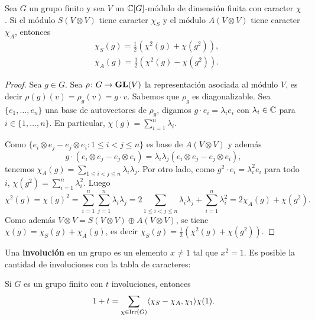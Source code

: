 \begin{proposition}
    Sea $G$ un grupo finito y  
    sea $V$ un $\mathbb{C}[G]$-módulo de dimensión finita con caracter $\chi$. Si el módulo $S(V\otimes V)$ 
    tiene caracter $\chi_S$ y el módulo $A(V\otimes V)$ tiene caracter $\chi_A$, entonces 
    \begin{align*}
        &\chi_S(g)=\frac12(\chi^2(g)+\chi(g^2)),\\
        &\chi_A(g)=\frac12(\chi^2(g)-\chi(g^2)).
    \end{align*}
\end{proposition}

\begin{proof}
    Sea $g\in G$. Sea $\rho\colon G\to\mathbf{GL}(V)$ la representación asociada al módulo $V$, es decir $\rho(g)(v)=\rho_g(v)=g\cdot v$. 
    Sabemos que $\rho_g$ es diagonalizable. Sea $\{e_1,\dots,e_n\}$ una base de autovectores de $\rho_g$, digamos
    $g\cdot e_i=\lambda_ie_i$ con $\lambda_i\in\mathbb{C}$ para $i\in\{1,\dots,n\}$. En particular, $\chi(g)=\sum_{i=1}^n\lambda_i$. 
    
    Como $\{e_i\otimes e_j-e_j\otimes e_i:1\leq i<j\leq n\}$ es base de $A(V\otimes V)$ y además 
    \[
    g\cdot (e_i\otimes e_j-e_j\otimes e_i)=\lambda_i\lambda_j(e_i\otimes e_j-e_j\otimes e_i),
    \]
    tenemos $\chi_A(g)=\sum_{1\leq i<j\leq n}\lambda_i\lambda_j$. Por otro lado, como $g^2\cdot e_i=\lambda_i^2e_i$ para todo $i$,
    $\chi(g^2)=\sum_{i=1}^n\lambda_i^2$. Luego
    \[
    \chi^2(g)=\chi(g)^2=\sum_{i=1}^n\sum_{j=1}^n\lambda_i\lambda_j=2\sum_{1\leq i<j\leq n}\lambda_i\lambda_j+\sum_{i=1}^n\lambda_i^2=2\chi_A(g)+\chi(g^2).
    \]
    Como además $V\otimes V=S(V\otimes V)\oplus A(V\otimes V)$, se tiene 
    $\chi(g)=\chi_S(g)+\chi_A(g)$, es decir 
    $\chi_S(g)=\frac12(\chi^2(g)+\chi(g^2))$.
\end{proof}

Una \textbf{involución} en un grupo es un elemento $x\ne 1$ tal que $x^2=1$. 
Es posible la cantidad de involuciones 
con la tabla de caracteres:

\begin{proposition}
Si $G$ es un grupo finito con $t$ involuciones, entonces 
\[
1+t=\sum_{\chi\in\operatorname{Irr}(G)}\langle\chi_S-\chi_A,\chi_1\rangle\chi(1).
\]
\end{proposition}

